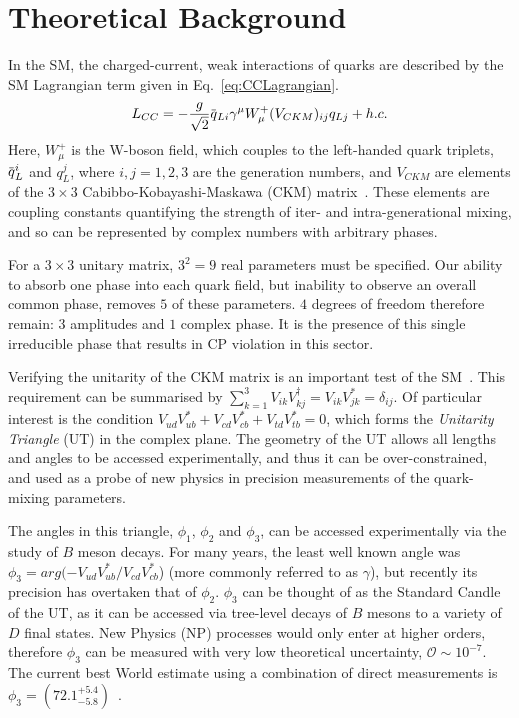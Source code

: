 \documentclass[oneside,12pt]{article}
\newcommand{\overbar}[1]{\mkern 1.5mu\overline{\mkern-1.5mu#1\mkern-1.5mu}\mkern 1.5mu}
\begin{document}
\section{\normalsize Theoretical Background}
In the SM, the charged-current, weak interactions of quarks are described by the SM Lagrangian term given in Eq.~\eqref{eq:CCLagrangian}.
\begin{equation}
  L_{CC}=-\frac{g}{\sqrt{2}}\overbar{q}_{Li}\gamma^{\mu}W_{\mu}^{+}(V_{CKM})_{ij}q_{Lj} + h.c.
  \label{eq:CCLagrangian}
\end{equation}
\noindent Here, $W_{\mu}^{+}$ is the W-boson field, which couples to the left-handed quark triplets, $\overbar{q}_{L}^{i}$ and $q_{L}^{j}$, where $i,j=1,2,3$ are the generation numbers, and $V_{CKM}$ are elements of the $3\times 3$ Cabibbo-Kobayashi-Maskawa (CKM) matrix~\cite{CKMTheory}. These elements are coupling constants quantifying the strength of iter- and intra-generational mixing, and so can be represented by complex numbers with arbitrary phases.

For a $3\times 3$ unitary matrix, $3^2=9$ real parameters must be specified. Our ability to absorb one phase into each quark field, but inability to observe an overall common phase, removes $5$ of these parameters. $4$ degrees of freedom therefore remain: $3$ amplitudes and $1$ complex phase. It is the presence of this single irreducible phase that results in CP violation in this sector.

Verifying the unitarity of the CKM matrix is an important test of the SM~\cite{CKMTheory}. This requirement can be summarised by $\sum_{k=1}^{3}V_{ik}V^{\dagger}_{kj}=V_{ik}V^*_{jk}=\delta_{ij}$. Of particular interest is the condition $V_{ud}V^{*}_{ub}+V_{cd}V^{*}_{cb}+V_{td}V^{*}_{tb}=0$, which forms the \emph{Unitarity Triangle}
  (UT) in the complex plane. The geometry of the UT allows all lengths and angles to be accessed experimentally, and thus it can be over-constrained, and used as a probe of new physics in precision measurements of the quark-mixing parameters. 

The angles in this triangle, $\phi_1$, $\phi_2$ and $\phi_3$, can be accessed experimentally via the study of $B$ meson decays. For many years, the least well known angle was $\phi_3=arg(-V_{ud}V^{*}_{ub}/V_{cd}V^{*}_{cb}$) (more commonly referred to as $\gamma$), but recently its precision has overtaken that of $\phi_2$. $\phi_3$ can be thought of as the Standard Candle of the UT, as it can be accessed via tree-level decays of $B$ mesons to a variety of $D$ final states. New Physics (NP)
processes would only enter at higher orders, therefore $\phi_3$ can be measured with very low theoretical uncertainty, $\mathcal{O} \sim 10^{-7}$. The current best World estimate
using a combination of direct measurements is $\phi_3=(72.1^{+5.4}_{-5.8})$\degree~\cite{website:CKMFitter}.
\end{document}

